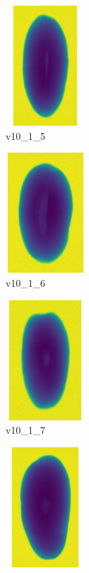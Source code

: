 \documentclass[11pt]{article}
\begin{document}
\begin{figure}
    
         \begin{subfigure}[b]{0.15\textwidth}
         \centering
         \includegraphics[width=3cm, height=4.5cm]{images/kartofler/v10_1_5_cut.png}
         \caption{v10\_1\_5}
         \label{fig:y equals x}
     \end{subfigure}
     \hfill
     \begin{subfigure}[b]{0.15\textwidth}
         \centering
         \includegraphics[width=3cm, height=4.5cm]{images/kartofler/v10_1_6_cut.png}
        \caption{v10\_1\_6}
         \label{fig:three sin x}
     \end{subfigure}
     \hfill
     \begin{subfigure}[b]{0.15\textwidth}
         \centering
         \includegraphics[width=3cm, height=4.5cm]{images/kartofler/v10_1_7_cut.png}
        \caption{v10\_1\_7}
         \label{fig:five over x}
     \end{subfigure}
     \hfill
    \begin{subfigure}[b]{0.15\textwidth}
         \centering
         \includegraphics[width=3cm, height=4.5cm]{images/kartofler/v10_1_8_cut.png}

\end{subfigure}
\end{figure}
\end{document}
